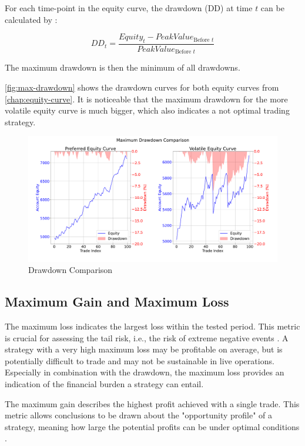 For each time-point in the equity curve, the drawdown (DD) at time $t$ can be calculated by \cite{dd}:

\[
    DD_t = \frac{Equity_t - PeakValue_{\text{Before }t}}{PeakValue_{\text{Before }t}}

\]

\noindent
The maximum drawdown is then the minimum of all drawdowns.

\autoref{fig:max-drawdown} shows the drawdown curves for both equity curves from \autoref{chap:equity-curve}.
It is noticeable that the maximum drawdown for the more volatile equity curve is much bigger, which also indicates a not optimal trading strategy.

\begin{figure}[H]
    \centering
    \includegraphics[width=\textwidth]{images/trading-strategies/max-drawdown}
    \caption{Drawdown Comparison}
    \label{fig:max-drawdown}
\end{figure}

\subsection{Maximum Gain and Maximum Loss}

The maximum loss indicates the largest loss within the tested period.
This metric is crucial for assessing the tail risk, i.e., the risk of extreme negative events \cite{max-loss}.
A strategy with a very high maximum loss may be profitable on average, but is potentially difficult to trade and may not be sustainable in live operations.
Especially in combination with the drawdown, the maximum loss provides an indication of the financial burden a strategy can entail.

The maximum gain describes the highest profit achieved with a single trade.
This metric allows conclusions to be drawn about the "opportunity profile" of a strategy, meaning how large the potential profits can be under optimal conditions \cite{max-gain}.


